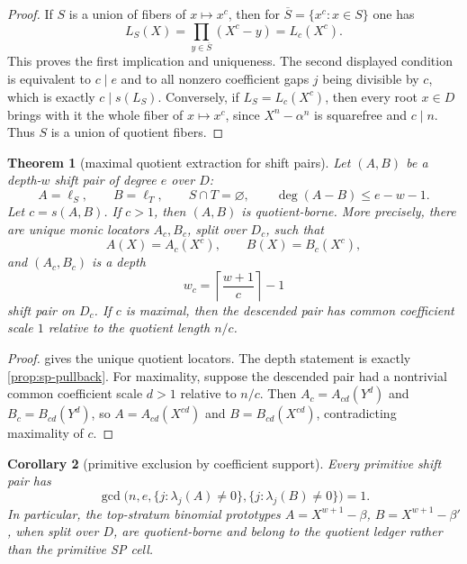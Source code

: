 \documentclass[a4paper,11pt]{amsart}
\newtheorem{theorem}{Theorem}[section]
\newtheorem{corollary}[theorem]{Corollary}
\theoremstyle{remark}
\begin{document}
\begin{proof}
If \(S\) is a union of fibers of \(x\mapsto x^c\), then for \(\overline S=\{x^c:x\in S\}\) one has
\[
        L_S(X)=\prod_{y\in\overline S}(X^c-y)=L_c(X^c).
\]
This proves the first implication and uniqueness.  The second displayed condition is equivalent to \(c\mid e\) and to all nonzero coefficient gaps \(j\) being divisible by \(c\), which is exactly \(c\mid s(L_S)\).  Conversely, if \(L_S=L_c(X^c)\), then every root \(x\in D\) brings with it the whole fiber of \(x\mapsto x^c\), since \(X^n-\alpha^n\) is squarefree and \(c\mid n\).  Thus \(S\) is a union of quotient fibers.
\end{proof}

\begin{theorem}[maximal quotient extraction for shift pairs]\label{thm:coeff-quotient-extract}
Let \((A,B)\) be a depth-\(w\) shift pair of degree \(e\) over \(D\):
\[
        A=\ell_S,\qquad B=\ell_T,\qquad S\cap T=\varnothing,\qquad
        \deg(A-B)\le e-w-1.
\]
Let \(c=s(A,B)\).  If \(c>1\), then \((A,B)\) is quotient-borne.  More precisely, there are unique monic locators \(A_c,B_c\), split over \(D_c\), such that
\[
        A(X)=A_c(X^c),\qquad B(X)=B_c(X^c),
\]
and \((A_c,B_c)\) is a depth
\[
        w_c=\left\lceil\frac{w+1}{c}\right\rceil-1
\]
shift pair on \(D_c\).  If \(c\) is maximal, then the descended pair has common coefficient scale \(1\) relative to the quotient length \(n/c\).
\end{theorem}

\begin{proof}
 gives the unique quotient locators.  The depth statement is exactly \cref{prop:sp-pullback}.  For maximality, suppose the descended pair had a nontrivial common coefficient scale \(d>1\) relative to \(n/c\).  Then \(A_c=A_{cd}(Y^d)\) and \(B_c=B_{cd}(Y^d)\), so \(A=A_{cd}(X^{cd})\) and \(B=B_{cd}(X^{cd})\), contradicting maximality of \(c\).
\end{proof}

\begin{corollary}[primitive exclusion by coefficient support]\label{cor:primitive-coeff-exclusion}
Every primitive shift pair has
\[
        \gcd\bigl(n,e,\{j:\lambda_j(A)\ne0\},\{j:\lambda_j(B)\ne0\}\bigr)=1.
\]
In particular, the top-stratum binomial prototypes \(A=X^{w+1}-\beta\), \(B=X^{w+1}-\beta'\), when split over \(D\), are quotient-borne and belong to the quotient ledger rather than the primitive SP cell.
\end{corollary}
\end{document}
